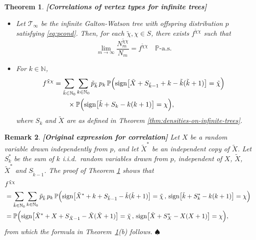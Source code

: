 \documentclass[11pt]{article}
\numberwithin{equation}{section}
\theoremstyle{plain}
\newtheorem{theorem}{Theorem}[section]
\newtheorem{remark}[theorem]{Remark}
\newcommand{\N}{\mathbb N}
\newcommand{\PP}{\mathbb{P}}
\newcommand{\tX}{\tilde{X}}
\newcommand{\tk}{\tilde{k}}
\newcommand{\tchi}{{\tilde{\chi}}}
\begin{document}
\begin{theorem}{\bf [Correlations of vertex types for infinite trees]}
\label{thm:correlations-on-infinite-trees}
\begin{itemize}
\item[(a)] 
Let $\mathcal{T}_\infty$ be the infinite Galton-Watson tree with offspring distribution $p$ satisfying \eqref{eq:pcond}. Then, for each $\tchi,\chi \in S$, there exists $f^{\tchi\chi}$ such that 
\[
\lim_{m\to\infty} \frac{N_m^{\tchi\chi}}{N_m} = f^{\tchi\chi} \quad \PP\text{-}\mathrm{a.s.}
\] 
\item[(b)] 
For $k \in \N$,
\[
\begin{aligned}
f^{\tchi\chi} &= \sum_{\tk \in \N_0} \sum_{k \in \N_0} \tilde{p}_{\tilde{k}}\, p_k\,
\PP\Big({\rm sign}\big[\tX+{S}_{\tilde{k}-1}+k-\tilde{k}(\tilde{k}+1)\big]=\tchi\Big)\\
&\qquad \times \PP\Big({\rm sign}\big[\tilde{k}+S_k-k(k+1)\big]=\chi\Big),
\end{aligned}
\]
where $S_k$ and $\tilde{X}$ are as defined in Theorem \ref{thm:densities-on-infinite-trees}.
\end{itemize}
\end{theorem}

\begin{remark}{\bf [Original expression for correlation]}
{\rm Let $X$ be a random variable drawn independently from $p$, and let $\tX^*$ be an independent copy of $\tX$. Let $S_k^*$ be the sum of $k$ i.i.d.\ random variables drawn from $p$, independent of $X$, $\tX$, $\tX^*$ and ${S}_{\tilde{k}-1}$. The proof of Theorem \ref{thm:correlations-on-infinite-trees} shows that
\begin{align}
\label{AP-fxx}
&f^{\tchi\chi}\nonumber\\ 
&=\sum_{\tk\in\N_0} \sum_{k\in\N_0}  \tilde{p}_{\tk}\,p_k\,
\PP\Big({\rm sign}\big[\tX^*+k+{S}_{\tilde{k}-1}-\tk(\tk+1)\big]=\tchi
\, ,\,{\rm sign}\big[\tk+S_k^* -k(k+1)\big]=\chi\Big)\nonumber\\
&=\PP\Big({\rm sign}\big[\tX^*+X+{S}_{\tX-1}-\tX(\tX+1)\big]=\tchi
\, ,\,{\rm sign}\big[\tX+S_X^* -X(X+1)\big]=\chi\Big),
\end{align}
from which the formula in Theorem~\ref{thm:correlations-on-infinite-trees}(b) follows.
}\hfill$\spadesuit$ 
\end{remark}
\end{document}
